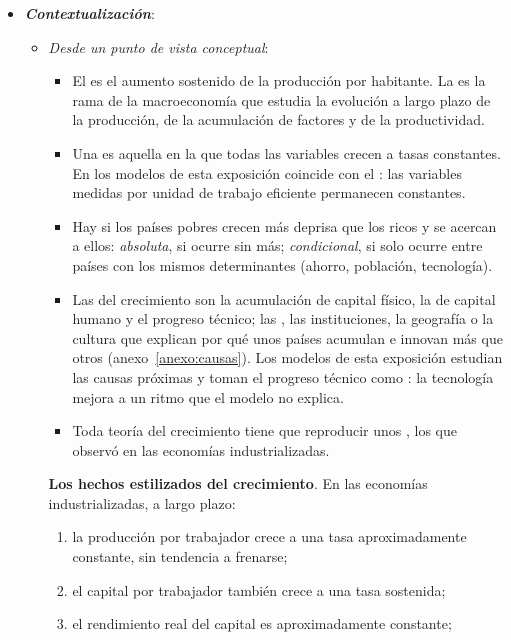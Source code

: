 \documentclass[11pt]{article}
\begin{document}
\begin{itemize}
\item \textbf{\emph{Contextualización}}:
  \begin{itemize}
  \item \emph{Desde un punto de vista conceptual}:
  \begin{itemize}
  \item El  es el aumento sostenido de la producción por habitante. La  es la rama de la macroeconomía que estudia la evolución a largo plazo de la producción, de la acumulación de factores y de la productividad.
  \item Una  es aquella en la que todas las variables crecen a tasas constantes. En los modelos de esta exposición coincide con el : las variables medidas por unidad de trabajo eficiente permanecen constantes.
  \item Hay  si los países pobres crecen más deprisa que los ricos y se acercan a ellos: \emph{absoluta}, si ocurre sin más; \emph{condicional}, si solo ocurre entre países con los mismos determinantes (ahorro, población, tecnología).
  \item Las  del crecimiento son la acumulación de capital físico, la de capital humano y el progreso técnico; las , las instituciones, la geografía o la cultura que explican por qué unos países acumulan e innovan más que otros (anexo~\ref{anexo:causas}). Los modelos de esta exposición estudian las causas próximas y toman el progreso técnico como : la tecnología mejora a un ritmo que el modelo no explica.
  \item Toda teoría del crecimiento tiene que reproducir unos , los que \textcite{Kaldor1961} observó en las economías industrializadas.
  \end{itemize}
  \begin{anotaciones}
  \textbf{Los hechos estilizados del crecimiento}\nocite{Kaldor1961}. En las economías industrializadas, a largo plazo:
  \begin{enumerate}
  \item la producción por trabajador crece a una tasa aproximadamente constante, sin tendencia a frenarse;
  \item el capital por trabajador también crece a una tasa sostenida;
  \item el rendimiento real del capital es aproximadamente constante;

\end{enumerate}
\end{anotaciones}
\end{itemize}
\end{itemize}
\end{document}
